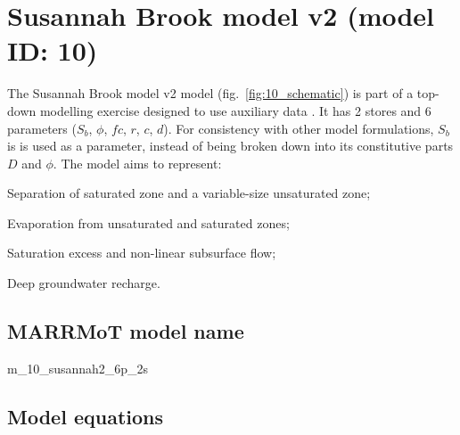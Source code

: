 \section{Susannah Brook model v2 (model ID: 10)}
The Susannah Brook model v2 model (fig.~\ref{fig:10_schematic}) is part of a top-down modelling exercise designed to use auxiliary data \citep{Son2007}. It has 2 stores and 6 parameters ($S_b$, $\phi$, $fc$, $r$, $c$, $d$). For consistency with other model formulations, $S_b$ is is used as a parameter, instead of being broken down into its constitutive parts $D$ and $\phi$. The model aims to represent:

\begin{itemizecompact}
\item Separation of saturated zone and a variable-size unsaturated zone;
\item Evaporation from unsaturated and saturated zones;
\item Saturation excess and non-linear subsurface flow;
\item Deep groundwater recharge.
\end{itemizecompact}

\subsection{MARRMoT model name}
m\_10\_susannah2\_6p\_2s \\

\subsection{Model equations}

